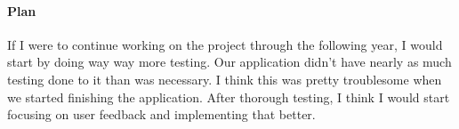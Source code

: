 \documentclass[onecolumn, draftclsnofoot,10pt, compsoc]{IEEEtran}
\begin{document}
	\paragraph{Plan}
	
	If I were to continue working on the project through the following year, I would start by doing way way more testing. Our application didn't have nearly as much testing done to it than was necessary. I think this was pretty troublesome when we started finishing the application. After thorough testing, I think I would start focusing on user feedback and implementing that better.
\end{document}
